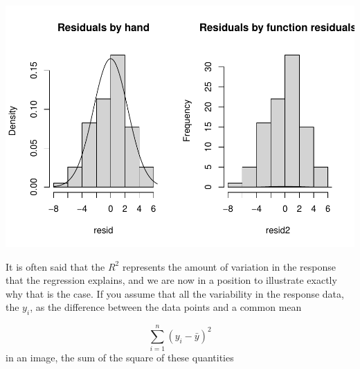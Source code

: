 \documentclass[
]{book}
\newenvironment{Shaded}{\begin{snugshade}}{\end{snugshade}}
\newcommand{\AttributeTok}[1]{\textcolor[rgb]{0.13,0.29,0.53}{#1}}
\newcommand{\CommentTok}[1]{\textcolor[rgb]{0.56,0.35,0.01}{\textit{#1}}}
\newcommand{\DecValTok}[1]{\textcolor[rgb]{0.00,0.00,0.81}{#1}}
\newcommand{\FunctionTok}[1]{\textcolor[rgb]{0.13,0.29,0.53}{\textbf{#1}}}
\newcommand{\NormalTok}[1]{#1}
\newcommand{\SpecialCharTok}[1]{\textcolor[rgb]{0.81,0.36,0.00}{\textbf{#1}}}
\begin{document}
\includegraphics{ECOMODbook_files/figure-latex/a6.12-1.pdf}

It is often said that the \(R^2\) represents the amount of variation in the response that the regression explains, and we are now in a position to illustrate exactly why that is the case. If you assume that all the variability in the response data, the \(y_i\), as the difference between the data points and a common mean

\[\sum_{i=1}^n (y_i- \bar y)^2\]
in an image, the sum of the square of these quantities

\begin{Shaded}
\end{Shaded}
\end{document}
